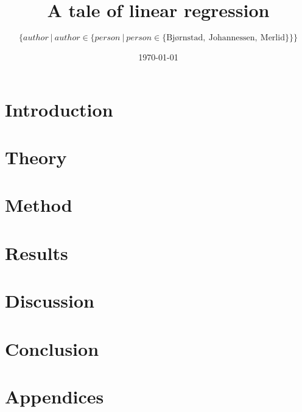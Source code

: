 \documentclass[aps,rmp,reprint,amsmath,amssymb,twocolumn,floatfix]{revtex4-1}
\begin{document}
\title{A tale of linear regression}

\author{$\{author\ |\ author\in \{person\ |\ person \in \{\text{Bjørnstad},\ \text{Johannessen}, \ \text{Merlid}\}\}\}$}
\date{\today}


\begin{abstract}

\end{abstract}
\maketitle

\tableofcontents

\section{Introduction}
\label{sec:introduction}

\section{Theory}


\section{Method}


\section{Results}


\section{Discussion}


\section{Conclusion}


\newpage
{} %

\appendix
\section{Appendices}
\label{appendix}

\end{document}
